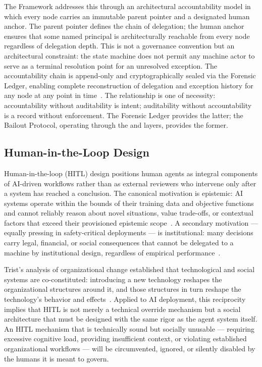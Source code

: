 The \bxthree{} Framework addresses this through an architectural accountability model in which every node carries an immutable parent pointer and a designated human anchor. The parent pointer defines the chain of delegation; the human anchor ensures that some named principal is architecturally reachable from every node regardless of delegation depth. This is not a governance convention but an architectural constraint: the \bxthree{} state machine does not permit any machine actor to serve as a terminal resolution point for an unresolved exception. The accountability chain is append-only and cryptographically sealed via the Forensic Ledger, enabling complete reconstruction of delegation and exception history for any node at any point in time~\cite{wiener1948}. The relationship is one of necessity: accountability without auditability is intent; auditability without accountability is a record without enforcement. The \bxthree{} Forensic Ledger provides the latter; the Bailout Protocol, operating through the \purpose{} and \bounds{} layers, provides the former.

\subsection{Human-in-the-Loop Design}
\label{sec:hitl}

Human-in-the-loop (HITL) design positions human agents as integral components of AI-driven workflows rather than as external reviewers who intervene only after a system has reached a conclusion. The canonical motivation is epistemic: AI systems operate within the bounds of their training data and objective functions and cannot reliably reason about novel situations, value trade-offs, or contextual factors that exceed their provisioned epistemic scope~\cite{tristr81}. A secondary motivation — equally pressing in safety-critical deployments — is institutional: many decisions carry legal, financial, or social consequences that cannot be delegated to a machine by institutional design, regardless of empirical performance~\cite{bansal2019}.

Trist's analysis of organizational change established that technological and social systems are co-constituted: introducing a new technology reshapes the organizational structures around it, and those structures in turn reshape the technology's behavior and effects~\cite{tristr81}. Applied to AI deployment, this reciprocity implies that HITL is not merely a technical override mechanism but a social architecture that must be designed with the same rigor as the agent system itself. An HITL mechanism that is technically sound but socially unusable — requiring excessive cognitive load, providing insufficient context, or violating established organizational workflows — will be circumvented, ignored, or silently disabled by the humans it is meant to govern.


